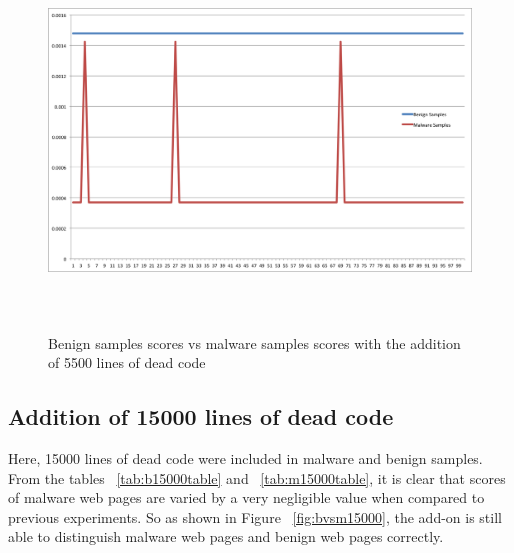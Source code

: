 \begin{figure}[h]
    \centering    
    \includegraphics[width=16cm, height=10cm]{5000.png}
    \caption[Benign Samples vs Malware Samples]{Benign samples scores vs malware samples scores with the addition of 5500 lines of dead code}
    \label{fig:bvsm5500}
\end{figure}

\subsection{Addition of 15000 lines of dead code}
Here, 15000 lines of dead code were included in malware and benign samples. From the tables ~\ref{tab:b15000table} and  ~\ref{tab:m15000table}, it is clear that scores of malware web pages are varied by a very negligible value when compared to previous experiments. So as shown in Figure ~\ref{fig:bvsm15000}, the add-on is still able to distinguish malware web pages and benign web pages correctly.

